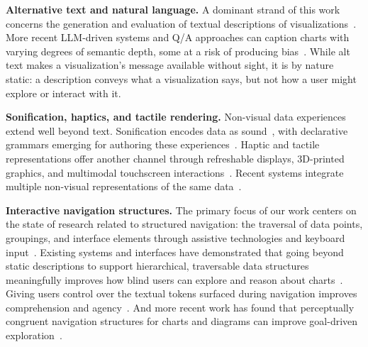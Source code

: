 \documentclass[12pt]{cmuthesis}
\begin{document}
\textbf{Alternative text and natural language.} A dominant strand of this work concerns the generation and evaluation of textual descriptions of visualizations~\cite{Lundgard2022Accessible, Jung2022Communicating, Kim2023Beyond, Kim2023Explain}. More recent LLM-driven systems and Q/A approaches can caption charts with varying degrees of semantic depth, some at a risk of producing bias~\cite{Farahani2023, Elavsky2025, Kim2023Exploring}. While alt text makes a visualization's message available without sight, it is by nature static: a description conveys what a visualization says, but not how a user might explore or interact with it.

\textbf{Sonification, haptics, and tactile rendering.} Non-visual data experiences extend well beyond text. Sonification encodes data as sound~\cite{Hermann2011, Mansur1985Sound, Brewster2002Visualization}, with declarative grammars emerging for authoring these experiences~\cite{Kim2024}. Haptic and tactile representations offer another channel through refreshable displays, 3D-printed graphics, and multimodal touchscreen interactions~\cite{Butler2021Technology, Marriott2026, Holloway2024, Reinders2025}. Recent systems integrate multiple non-visual representations of the same data~\cite{Seo2024, Holloway2022, Chundury2022Towards}.


\textbf{Interactive navigation structures.} The primary focus of our work centers on the state of research related to structured navigation: the traversal of data points, groupings, and interface elements through assistive technologies and keyboard input~\cite{Sorge2016Polyfilling, WAI2017Keyboard, Zong2022Rich, Elavsky2023}. Existing systems and interfaces have demonstrated that going beyond static descriptions to support hierarchical, traversable data structures meaningfully improves how blind users can explore and reason about charts~\cite{Zong2022Rich, Thompson2023Chart}. Giving users control over the textual tokens surfaced during navigation improves comprehension and agency~\cite{Jones2024}. And more recent work has found that perceptually congruent navigation structures for charts and diagrams can improve goal-driven exploration~\cite{Mei2025}.
\end{document}
